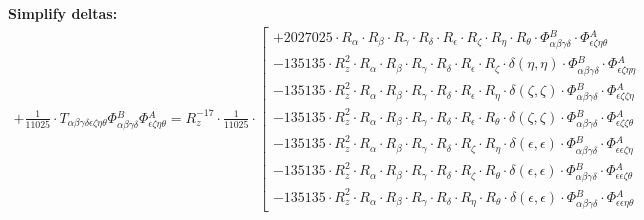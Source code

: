 \documentclass{article}
\begin{document}
\textbf{Simplify deltas:}
\begin{subequations}\begin{gather}
+ \frac{1}{11025} \cdot T_{\alpha{}\beta{}\gamma{}\delta{}\epsilon{}\zeta{}\eta{}\theta{}} \Phi{}^{B}_{\alpha{}\beta{}\gamma{}\delta{}} \Phi{}^{A}_{\epsilon{}\zeta{}\eta{}\theta{}} = R_{z}^{-17} \cdot \frac{1}{11025} \cdot  \left[ \begin{array}{c} 
 		+ 2027025 \cdot R_{\alpha{}} \cdot R_{\beta{}} \cdot R_{\gamma{}} \cdot R_{\delta{}} \cdot R_{\epsilon{}} \cdot R_{\zeta{}} \cdot R_{\eta{}} \cdot R_{\theta{}} \cdot \Phi{}^{B}_{\alpha{}\beta{}\gamma{}\delta{}} \cdot \Phi{}^{A}_{\epsilon{}\zeta{}\eta{}\theta{}} 
 \\[0.2em] 		 - 135135 \cdot R_{z}^{2} \cdot R_{\alpha{}} \cdot R_{\beta{}} \cdot R_{\gamma{}} \cdot R_{\delta{}} \cdot R_{\epsilon{}} \cdot R_{\zeta{}} \cdot \delta{}\left(\eta{}, \eta{}\right) \cdot \Phi{}^{B}_{\alpha{}\beta{}\gamma{}\delta{}} \cdot \Phi{}^{A}_{\epsilon{}\zeta{}\eta{}\eta{}} 
 \\[0.2em] 		 - 135135 \cdot R_{z}^{2} \cdot R_{\alpha{}} \cdot R_{\beta{}} \cdot R_{\gamma{}} \cdot R_{\delta{}} \cdot R_{\epsilon{}} \cdot R_{\eta{}} \cdot \delta{}\left(\zeta{}, \zeta{}\right) \cdot \Phi{}^{B}_{\alpha{}\beta{}\gamma{}\delta{}} \cdot \Phi{}^{A}_{\epsilon{}\zeta{}\zeta{}\eta{}} 
 \\[0.2em] 		 - 135135 \cdot R_{z}^{2} \cdot R_{\alpha{}} \cdot R_{\beta{}} \cdot R_{\gamma{}} \cdot R_{\delta{}} \cdot R_{\epsilon{}} \cdot R_{\theta{}} \cdot \delta{}\left(\zeta{}, \zeta{}\right) \cdot \Phi{}^{B}_{\alpha{}\beta{}\gamma{}\delta{}} \cdot \Phi{}^{A}_{\epsilon{}\zeta{}\zeta{}\theta{}} 
 \\[0.2em] 		 - 135135 \cdot R_{z}^{2} \cdot R_{\alpha{}} \cdot R_{\beta{}} \cdot R_{\gamma{}} \cdot R_{\delta{}} \cdot R_{\zeta{}} \cdot R_{\eta{}} \cdot \delta{}\left(\epsilon{}, \epsilon{}\right) \cdot \Phi{}^{B}_{\alpha{}\beta{}\gamma{}\delta{}} \cdot \Phi{}^{A}_{\epsilon{}\epsilon{}\zeta{}\eta{}} 
 \\[0.2em] 		 - 135135 \cdot R_{z}^{2} \cdot R_{\alpha{}} \cdot R_{\beta{}} \cdot R_{\gamma{}} \cdot R_{\delta{}} \cdot R_{\zeta{}} \cdot R_{\theta{}} \cdot \delta{}\left(\epsilon{}, \epsilon{}\right) \cdot \Phi{}^{B}_{\alpha{}\beta{}\gamma{}\delta{}} \cdot \Phi{}^{A}_{\epsilon{}\epsilon{}\zeta{}\theta{}} 
 \\[0.2em] 		 - 135135 \cdot R_{z}^{2} \cdot R_{\alpha{}} \cdot R_{\beta{}} \cdot R_{\gamma{}} \cdot R_{\delta{}} \cdot R_{\eta{}} \cdot R_{\theta{}} \cdot \delta{}\left(\epsilon{}, \epsilon{}\right) \cdot \Phi{}^{B}_{\alpha{}\beta{}\gamma{}\delta{}} \cdot \Phi{}^{A}_{\epsilon{}\epsilon{}\eta{}\theta{}} 

\end{array}
\end{gather}
\end{subequations}
\end{document}
